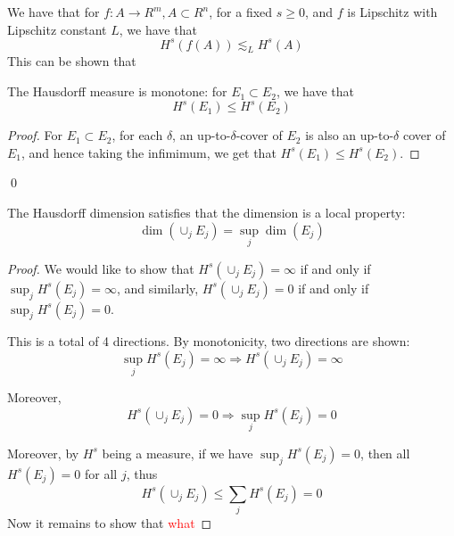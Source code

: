 \begin{exercise}
    We have that for $f: A\to R^m, A\subset R^n$, for a fixed $s\geq 0$, and $f$ is Lipschitz with Lipschitz constant $L$, we have that 
    \begin{equation*}
        H^s(f(A))\lesssim_LH^s(A)
    \end{equation*}
    This can be shown that  
\end{exercise}

\begin{proposition}
    The Hausdorff measure is monotone: for $E_1\subset E_2$, we have that
    \begin{equation*}
        H^s(E_1)\leq H^s(E_2)
    \end{equation*}
\end{proposition}
\begin{proof}
    For $E_1\subset E_2$, for each $\delta$,  an up-to-$\delta$-cover of $E_2$ is also an up-to-$\delta$ cover of $E_1$, and hence taking the infimimum, we get that $H^s(E_1)\leq H^s(E_2)$.
\end{proof}
\qed


\begin{proposition}
    The Hausdorff dimension satisfies that the dimension is a local property:
    \begin{equation*}
        \dim(\cup_jE_j)=\sup_j\dim(E_j)
    \end{equation*}
\end{proposition}
\begin{proof}
    We would like to show that $H^s(\cup_jE_j)=\infty$ if and only if $\sup_jH^s(E_j)=\infty$, and similarly, $H^s(\cup_jE_j)=0$ if and only if $\sup_jH^s(E_j)=0$.

    This is a total of 4 directions. By monotonicity, two directions are shown:
    \begin{equation*}
        \sup_jH^s(E_j)=\infty \Rightarrow H^s(\cup_jE_j)=\infty
    \end{equation*}

    Moreover,
    \begin{equation*}
        H^s(\cup_jE_j)=0\Rightarrow \sup_jH^s(E_j)=0
    \end{equation*}

    Moreover, by $H^s$ being a measure, if we have $\sup_jH^s(E_j)=0$, then all $H^s(E_j)=0$ for all $j$, thus
    \begin{equation*}
        H^s(\cup_jE_j)\leq\sum_jH^s(E_j)=0
    \end{equation*}
    Now it remains to show that \textcolor{red}{what}

\end{proof}


